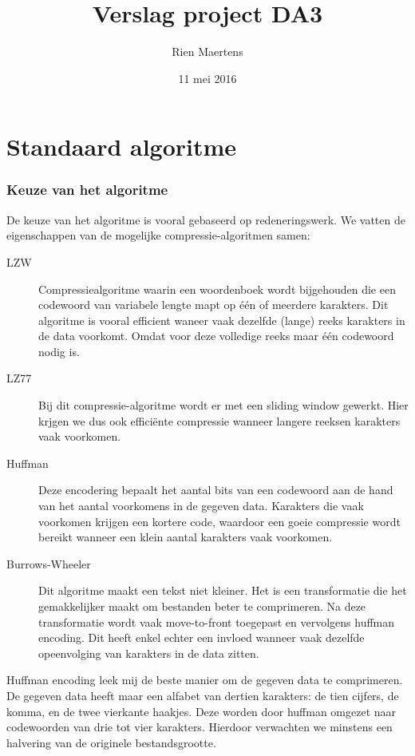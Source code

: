 \documentclass[a4paper]{article}
\author{Rien Maertens}
\title{Verslag project DA3}
\date{11 mei 2016}
\begin{document}
\maketitle

\part{Standaard algoritme}

\section{Keuze van het algoritme}

De keuze van het algoritme is vooral gebaseerd op redeneringswerk. We vatten de eigenschappen van de mogelijke compressie-algoritmen samen:
\begin{description}
    \item [LZW] Compressiealgoritme waarin een woordenboek wordt bijgehouden die een codewoord van variabele lengte mapt op één of meerdere karakters. Dit algoritme is vooral efficient waneer vaak dezelfde (lange) reeks karakters in de data voorkomt. Omdat voor deze volledige reeks maar één codewoord nodig is.
    \item [LZ77] Bij dit compressie-algoritme wordt er met een sliding window gewerkt. Hier krjgen we dus ook efficiënte compressie wanneer langere reeksen karakters vaak voorkomen.
    \item [Huffman] Deze encodering bepaalt het aantal bits van een codewoord aan de hand van het aantal voorkomens in de gegeven data. Karakters die vaak voorkomen krijgen een kortere code, waardoor een goeie compressie wordt bereikt wanneer een klein aantal karakters vaak voorkomen.
    \item [Burrows-Wheeler] Dit algoritme maakt een tekst niet kleiner. Het is een transformatie die het gemakkelijker maakt om bestanden beter te comprimeren. Na deze transformatie wordt vaak move-to-front toegepast en vervolgens huffman encoding. Dit heeft enkel echter een invloed wanneer vaak dezelfde opeenvolging van karakters in de data zitten.
\end{description}

Huffman encoding leek mij de beste manier om de gegeven data te comprimeren. De gegeven data heeft maar een alfabet van dertien karakters: de tien cijfers, de komma, en de twee vierkante haakjes. Deze worden door huffman omgezet naar codewoorden van drie tot vier karakters. Hierdoor verwachten we minstens een halvering van de originele bestandsgrootte.
\end{document}
